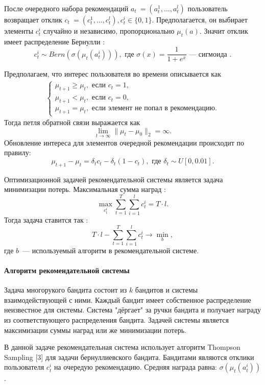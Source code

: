 \documentclass[12pt, twoside]{article}
\begin{document}
После очередного набора рекомендаций $a_t~= (a_t^1, \dots, a_t^l)$ пользователь возвращает $\textit{отклик}$ $c_t~= (c_t^1, \dots, c_t^l), c_t^i \in \{0, 1\}$. 
Предполагается, он выбирает элементы $c_t^i$ случайно и независимо, пропорционально $\mu_t(a)$.
Значит отклик имеет распределение Бернулли : 
\[c_t^i \sim Bern (\sigma(\mu_t(a_t^i))), \text{ где } \sigma(x) = \frac{1}{1+e^x}\text{~--- сигмоида }. \] 

Предполагаем, что интерес пользователя во времени описывается как 
\begin{gather*}
  \begin{cases}
    \mu_{t+1} \geq \mu_{t}, \text{ если } c_t = 1,  \\
    \mu_{t+1} < \mu_{t}, \text{ если } c_t = 0, \\
    \mu_{t+1} = \mu_t, \text{ если элемент не попал в рекомендацию}.
  \end{cases}
\end{gather*}
Тогда петля обратной связи выражается как 
\begin{equation}\label{eq1} 
\lim_{t \to \infty} \|\mu_t - \mu_0 \|_2 = \infty. 
\end{equation}
Обновление интереса для элементов очередной рекомендации происходит по правилу: 
\begin{equation}\label{eq2}
\mu_{t+1} - \mu_{t} = \delta_t c_t - \delta_t (1 - c_t), \text{ где } \delta_t \sim U[0, 0.01].
\end{equation}

Оптимизационной задачей рекомендательной системы является задача минимизации потерь. 
Максимальная сумма наград : \[ \max_{c_t^i} \sum_{t = 1}^T \sum_{i = 1}^l c_t^i = T \cdot l.\] 
Тогда задача ставится так : 
\[
  T \cdot l - \sum_{t = 1}^T \sum_{i = 1}^l c_t^i \to \min_{b}, 
\]
где $b$~--- используемый алгоритм в рекомендательной системе. 

\paragraph{Алгоритм рекомендательной системы}
Задача многорукого бандита состоит из $k$ бандитов и системы взаимодействующей с ними. 
Каждый бандит имеет собственное распределение неизвестное для системы. 
Система "дёргает" за ручки бандита и получает награду из соответствующего распределения бандита. 
Задачей системы является максимизации суммы наград или же минимизации потерь. 

В данной задаче рекомендательная система использует алгоритм Thompson Sampling [3] для задачи бернуллиевского бандита.  
Бандитами являются отклики пользователя $c_t^i$ на очередую рекомендацию.
Средняя награда равна: $\sigma(\mu_t(a_t^i))$.
\end{document}

